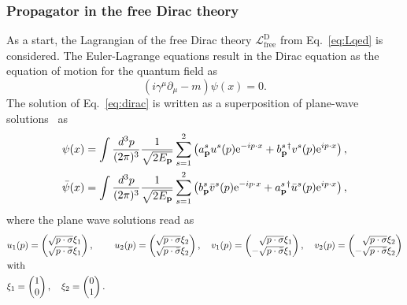 \subsubsection*{Propagator in the free Dirac theory}
As a start, the Lagrangian of the free Dirac theory $\mathcal{L}_{\text{free}}^{\text{D}}$ from Eq.~\eqref{eq:Lqed} is considered. The Euler-Lagrange equations result in the Dirac equation as the equation of motion for the quantum field as
\begin{equation}
\label{eq:dirac}
\left( i\gamma^\mu \partial_\mu -m \right) \psi(x) = 0.
\end{equation}
The solution of Eq.~\eqref{eq:dirac} is written as a superposition of plane-wave solutions~\mbox{\cite[Section~3.3.]{peskin1995}} as
\begin{alignat}{2}
& \psi(x) = 
\int \frac{\mathrm{}d^3p}{(2\pi)^3}\frac{1}{\sqrt{2E_\mathbf{p}}} 
\sum_{s=1}^{2} \left(a^s_\mathbf{p}u^s(p) \text{e}^{-ip\cdot x} + b^{s\,\dagger}_{\mathbf{p}}v^s(p) \text{e}^{ip\cdot x} \right),\\
& \bar{\psi}(x) = 
\int \frac{\mathrm{}d^3p}{(2\pi)^3}\frac{1}{\sqrt{2E_\mathbf{p}}} 
\sum_{s=1}^{2} \left(b^s_\mathbf{p}\bar{v}^s(p) \text{e}^{-ip\cdot x} + a^{s\,\dagger}_{\mathbf{p}}\bar{u}^s(p) \text{e}^{ip\cdot x} \right),\\
\end{alignat}
where the plane wave solutions read as
\begin{alignat}{4}
& u_1(p)= \begin{pmatrix}\sqrt{p\cdot \sigma}\xi_1\\\sqrt{p\cdot \bar{\sigma}}\xi_1\end{pmatrix},\,&& 
u_2(p)= \begin{pmatrix}\sqrt{p\cdot \sigma}\xi_2\\\sqrt{p\cdot \bar{\sigma}}\xi_2\end{pmatrix},\,&& 
v_1(p)= \begin{pmatrix}\phantom{-}\sqrt{p\cdot \sigma}\xi_1\\-\sqrt{p\cdot \bar{\sigma}}\xi_1\end{pmatrix},\,&& 
v_2(p)= \begin{pmatrix}\phantom{-}\sqrt{p\cdot \sigma}\xi_2\\-\sqrt{p\cdot \bar{\sigma}}\xi_2\end{pmatrix}\notag\\
&\text{with}\\
&\xi_1=\begin{pmatrix}1\\0\end{pmatrix},\quad
\xi_2=\begin{pmatrix}0\\1\end{pmatrix}.\notag
\end{alignat}
